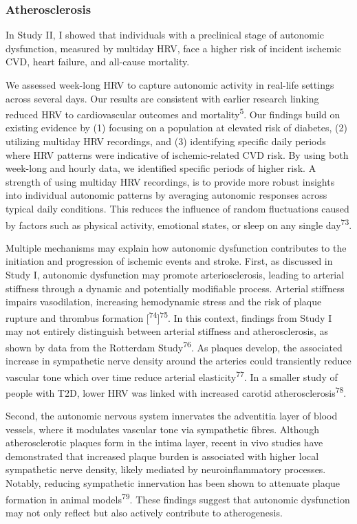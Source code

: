 \documentclass[
  a4paper,
  headsepline=true,
  open=any]{scrbook}
\begin{document}
\hypertarget{atherosclerosis-1}{%
\subsubsection{Atherosclerosis}\label{atherosclerosis-1}}

In Study II, I showed that individuals with a preclinical stage of
autonomic dysfunction, measured by multiday HRV, face a higher risk of
incident ischemic CVD, heart failure, and all-cause mortality.

We assessed week-long HRV to capture autonomic activity in real-life
settings across several days. Our results are consistent with earlier
research linking reduced HRV to cardiovascular outcomes and
mortality\textsuperscript{5}. Our findings build on existing evidence by
(1) focusing on a population at elevated risk of diabetes, (2) utilizing
multiday HRV recordings, and (3) identifying specific daily periods
where HRV patterns were indicative of ischemic-related CVD risk. By
using both week-long and hourly data, we identified specific periods of
higher risk. A strength of using multiday HRV recordings, is to provide
more robust insights into individual autonomic patterns by averaging
autonomic responses across typical daily conditions. This reduces the
influence of random fluctuations caused by factors such as physical
activity, emotional states, or sleep on any single
day\textsuperscript{73}.

Multiple mechanisms may explain how autonomic dysfunction contributes to
the initiation and progression of ischemic events and stroke. First, as
discussed in Study I, autonomic dysfunction may promote
arteriosclerosis, leading to arterial stiffness through a dynamic and
potentially modifiable process. Arterial stiffness impairs vasodilation,
increasing hemodynamic stress and the risk of plaque rupture and
thrombus formation {[}\textsuperscript{74}{]}\textsuperscript{75}. In
this context, findings from Study I may not entirely distinguish between
arterial stiffness and atherosclerosis, as shown by data from the
Rotterdam Study\textsuperscript{76}. As plaques develop, the associated
increase in sympathetic nerve density around the arteries could
transiently reduce vascular tone which over time reduce arterial
elasticity\textsuperscript{77}. In a smaller study of people with T2D,
lower HRV was linked with increased carotid
atherosclerosis\textsuperscript{78}.

Second, the autonomic nervous system innervates the adventitia layer of
blood vessels, where it modulates vascular tone via sympathetic fibres.
Although atherosclerotic plaques form in the intima layer, recent in
vivo studies have demonstrated that increased plaque burden is
associated with higher local sympathetic nerve density, likely mediated
by neuroinflammatory processes. Notably, reducing sympathetic
innervation has been shown to attenuate plaque formation in animal
models\textsuperscript{79}. These findings suggest that autonomic
dysfunction may not only reflect but also actively contribute to
atherogenesis.
\end{document}

